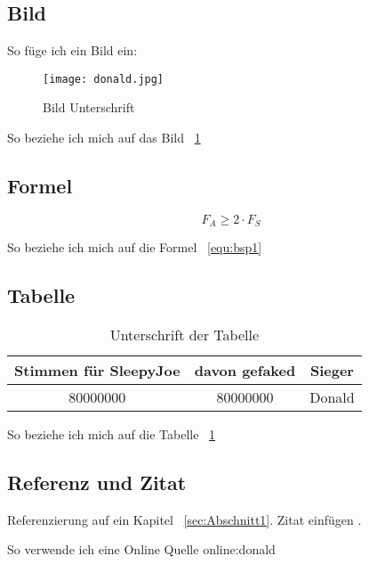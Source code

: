 \subsection{Bild}
\label{subsec:Bild}
So füge ich ein Bild ein:

\begin{figure}[H]
	\centering
	\texttt{[image: donald.jpg]}
	\caption[Titel für das Abbildungsverzeichnis]{Bild Unterschrift}
	\label{fig:donald}
\end{figure}

So beziehe ich mich auf das Bild ~\ref{fig:donald}

\subsection{Formel}
\label{subsec:formel}

\begin{equation}
	\label{equ:bsp1}
	F_{A} \geq 2 \cdot F_{S}
\end{equation}

So beziehe ich mich auf die Formel ~\ref{equ:bsp1}


\subsection{Tabelle}
\label{subsec:table}
\begin{table}[htb]
	\begin{center}
		\begin{tabular}[h]{|c|c|c|}	
			\hline
			Stimmen für SleepyJoe & davon gefaked  & Sieger \\
			\hline
			80000000 & 80000000 & Donald \\
			\hline
		\end{tabular}
		\caption{Unterschrift  der Tabelle}
		\label{tab:Tabelle1}
	\end{center}
\end{table}

So beziehe ich mich auf die Tabelle ~\ref{tab:Tabelle1}


\subsection{Referenz und Zitat}
\label{subsec:refcite}
Referenzierung auf ein Kapitel ~\ref{sec:Abschnitt1}.
Zitat einfügen
\cite{donaldtrumpDonaldWilde2020}.

So verwende ich eine Online Quelle \gls{online:donald}
